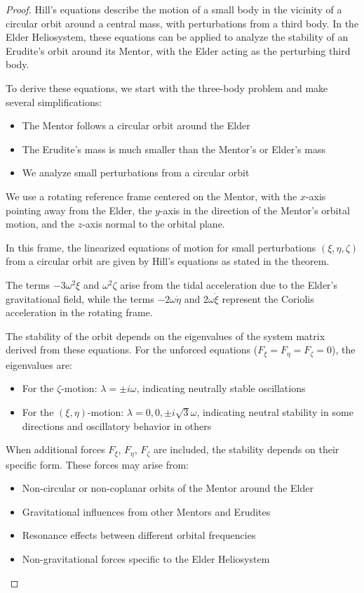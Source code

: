 \begin{proof}
Hill's equations describe the motion of a small body in the vicinity of a circular orbit around a central mass, with perturbations from a third body. In the Elder Heliosystem, these equations can be applied to analyze the stability of an Erudite's orbit around its Mentor, with the Elder acting as the perturbing third body.

To derive these equations, we start with the three-body problem and make several simplifications:
\begin{itemize}
    \item The Mentor follows a circular orbit around the Elder
    \item The Erudite's mass is much smaller than the Mentor's or Elder's mass
    \item We analyze small perturbations from a circular orbit
\end{itemize}

We use a rotating reference frame centered on the Mentor, with the $x$-axis pointing away from the Elder, the $y$-axis in the direction of the Mentor's orbital motion, and the $z$-axis normal to the orbital plane.

In this frame, the linearized equations of motion for small perturbations $(\xi, \eta, \zeta)$ from a circular orbit are given by Hill's equations as stated in the theorem.

The terms $-3\omega^2\xi$ and $\omega^2\zeta$ arise from the tidal acceleration due to the Elder's gravitational field, while the terms $-2\omega\dot{\eta}$ and $2\omega\dot{\xi}$ represent the Coriolis acceleration in the rotating frame.

The stability of the orbit depends on the eigenvalues of the system matrix derived from these equations. For the unforced equations ($F_{\xi} = F_{\eta} = F_{\zeta} = 0$), the eigenvalues are:
\begin{itemize}
    \item For the $\zeta$-motion: $\lambda = \pm i\omega$, indicating neutrally stable oscillations
    \item For the $(\xi, \eta)$-motion: $\lambda = 0, 0, \pm i\sqrt{3}\omega$, indicating neutral stability in some directions and oscillatory behavior in others
\end{itemize}

When additional forces $F_{\xi}$, $F_{\eta}$, $F_{\zeta}$ are included, the stability depends on their specific form. These forces may arise from:
\begin{itemize}
    \item Non-circular or non-coplanar orbits of the Mentor around the Elder
    \item Gravitational influences from other Mentors and Erudites
    \item Resonance effects between different orbital frequencies
    \item Non-gravitational forces specific to the Elder Heliosystem
\end{itemize}


\end{proof}
